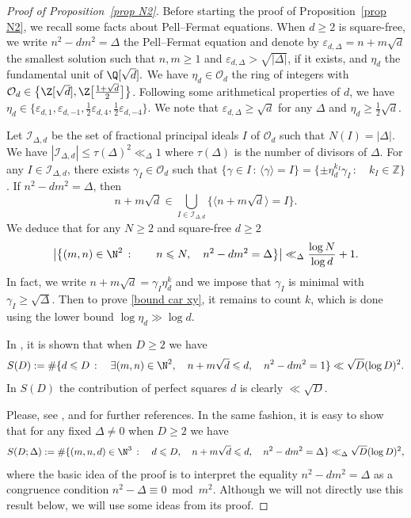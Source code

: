 \documentclass[reqno, 12pt]{amsart}
\theoremstyle{plain}
\theoremstyle{definition}
\theoremstyle{remark}
\renewcommand{\ge}{\geqslant}
\renewcommand{\leq}{\leqslant}
\renewcommand{\geq}{\geqslant}
\begin{document}
\begin{proof}[Proof of Proposition~\ref{prop N2}]
Before starting the proof of Proposition~\ref{prop N2}, we recall some facts about Pell--Fermat equations.
When $d\geq 2$  is square-free, we write $n^2-dm^2=\Delta$ the Pell--Fermat equation and denote by $\varepsilon_{d,\Delta}=n+m\sqrt{d}$ the smallest solution such that $n,m\ge 1$ and $\varepsilon_{d,\Delta}>\sqrt{|\Delta|}$, if it exists,
and $\eta_d$ the fundamental unit of $\Q[\sqrt{d}].$ We have $\eta_d\in {\mathcal O}_d$ the ring of integers with ${\mathcal O}_d\in \big\{\Z[\sqrt{d}], \Z\big[\frac{1+\sqrt{d}}{2}\big]\big\}$.
Following some arithmetical properties of $d$, we have $\eta_d\in \{\varepsilon_{d,1},\varepsilon_{d,-1},\tfrac12\varepsilon_{d,4},\tfrac12\varepsilon_{d,-4} \}.$
We note that $\varepsilon_{d,\Delta}\geq \sqrt{d}$ for any $\Delta$ and $\eta_d\geq\tfrac12 \sqrt{d}$.


Let  ${\mathcal I}_{\Delta,d}$ be the set of fractional principal ideals $I$ of ${\mathcal O}_d$ such that $N(I)=|\Delta|$. We have $|{\mathcal I}_{\Delta,d}|\leq \tau(\Delta)^2\ll_\Delta 1$ where $\tau(\Delta)$ is the number of divisors of $\Delta$.   For any $I\in {\mathcal I}_{\Delta,d}$, there exists $\gamma_I\in {\mathcal O}_d$ such that $\{\gamma\in I\,:\, \langle \gamma\rangle =I\}=\{ \pm \eta_d^{k_I}\gamma_I\,:\quad k_I\in \mathbb Z
\}$.
 If $n^2-dm^2=\Delta$, then
 $$n+m\sqrt{d} \in \bigcup_{I\in \mathcal I_{\Delta,d}}\{ \langle n+m\sqrt{d}\rangle =I\}.$$
 We deduce that for any $N\geq 2$ and   
 square-free $d\geq 2$
\begin{equation}
    \label{bound car xy}
\big|\big\{(m,n)\in \N^2\,:\qquad  n\leq N,\quad  n^2-dm^2=\Delta\big\}\big|\ll_\Delta \frac{\log N}{\log d}+1    .\end{equation}
In fact, we write $n+m\sqrt{d}=\gamma_I\eta_d^k$ and we impose that $\gamma_I$ is minimal with $\gamma_I\geq \sqrt{\Delta}.$
Then to prove \eqref{bound car xy}, it remains to count $k$, which is done using the lower bound $\log\eta_d\gg \log d$.

 
 In \cite[Theorem 1]{H84}, it is shown that when $D\geq 2$ we have 
  $$S(D):=\#\{ d\leq D\,:\quad \exists (m,n)\in \N^2,\quad n+m\sqrt{d}\leq d,
  \quad n^2-dm^2=1\}\ll \sqrt{D}(\log D)^2.$$
In $S(D)$ the contribution of perfect squares $d$ is clearly $\ll \sqrt{D}. $

  
 Please, see \cite{F16}, \cite{FJ12} and \cite{FJ13} for further references.
 In the same fashion,
 it is easy to show that for any fixed $\Delta\neq 0$  when $D\geq 2$ we have 
  $$S(D;\Delta):=\#\{ (m,n,d)\in \N^3\,:\quad d\leq D,\quad n+m\sqrt{d}\leq d,\quad n^2-dm^2=\Delta\}\ll_\Delta \sqrt{D}(\log D)^2,$$
  where the basic idea of the proof is to interpret the equality $n^2-dm^2=\Delta$
 as a congruence condition $n^2-\Delta \equiv 0\bmod{m^2}$.
 Although we will not directly use this result below, we will use some ideas from its proof. 
   

\end{proof}
\end{document}
